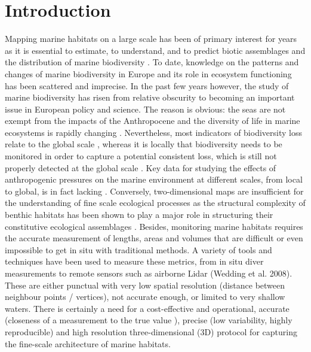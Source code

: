 \section[Introduction]{Introduction}\label{chapitre2_1}
Mapping marine habitats on a large scale has been of primary interest for years as it is essential to estimate, to understand, and to predict biotic assemblages and the distribution of marine biodiversity \citep{tittensor_mid-term_2014}. To date, knowledge on the patterns and changes of marine biodiversity in Europe and its role in ecosystem functioning has been scattered and imprecise. In the past few years however, the study of marine biodiversity has risen from relative obscurity to becoming an important issue in European policy and science. The reason is obvious: the seas are not exempt from the impacts of the Anthropocene and the diversity of life in marine ecosystems is rapidly changing \citep{mcgill_fifteen_2015}. Nevertheless, most indicators of biodiversity loss relate to the global scale \citep{pimm_biodiversity_2014}, whereas it is locally that biodiversity needs to be monitored in order to capture a potential consistent loss, which is still not properly detected at the global scale \citep{dornelas_assemblage_2014}. Key data for studying the effects of anthropogenic pressures on the marine environment at different scales, from local to global, is in fact lacking \citep{halpern_global_2008}. Conversely, two-dimensional maps are insufficient for the understanding of fine scale ecological processes as the structural complexity of benthic habitats has been shown to play a major role in structuring their constitutive ecological assemblages \citep{agudo-adriani_colony_2016, darling_relationships_2017, friedlander_designing_2003, graham_importance_2013, kovalenko_habitat_2012}. Besides, monitoring marine habitats requires the accurate measurement of lengths, areas and volumes that are difficult or even impossible to get in situ with traditional methods. A variety of tools and techniques have been used to measure these metrics, from in situ diver measurements \citep{dustan_digital_2013} to remote sensors such as airborne Lidar (Wedding et al. 2008). These are either punctual with very low spatial resolution (distance between neighbour points / vertices), not accurate enough, or limited to very shallow waters. There is certainly a need for a cost-effective and operational, accurate (closeness of a measurement to the true value \citep{granshaw_photogrammetric_2016}), precise (low variability, highly reproducible) and high resolution three-dimensional (3D) protocol for capturing the fine-scale architecture of marine habitats.


